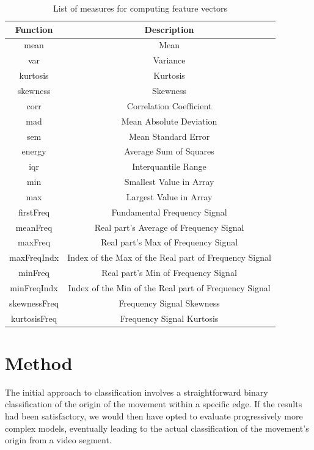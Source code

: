 \begin{table}[H]
    \centering
    \begin{tabular}{|c|c|}
        \hline
        \textbf{Function} & \textbf{Description} \\
        \hline
        mean & Mean \\
        var & Variance \\
        kurtosis & Kurtosis \\
        skewness & Skewness \\
        corr & Correlation Coefficient \\
        mad & Mean Absolute Deviation \\
        sem & Mean Standard Error \\
        energy & Average Sum of Squares \\
        iqr & Interquantile Range \\
        min & Smallest Value in Array \\
        max & Largest Value in Array \\
        firstFreq & Fundamental Frequency Signal \\
        meanFreq & Real part's Average of Frequency Signal \\
        maxFreq & Real part's Max of Frequency Signal \\
        maxFreqIndx & Index of the Max of the Real part of Frequency Signal \\ 
        minFreq & Real part's Min of Frequency Signal \\
        minFreqIndx & Index of the Min of the Real part of Frequency Signal \\ 
        skewnessFreq & Frequency Signal Skewness \\
        kurtosisFreq & Frequency Signal Kurtosis \\
        \hline
    \end{tabular}
    \caption{List of measures for computing feature vectors}
\label{tab:ml_features}
\end{table}

\section{Method}

The initial approach to classification involves a straightforward binary classification of the origin of the movement within a specific edge.
If the results had been satisfactory, we would then have opted to evaluate progressively more complex models, eventually leading to the actual classification of the movement's origin from a video segment.

